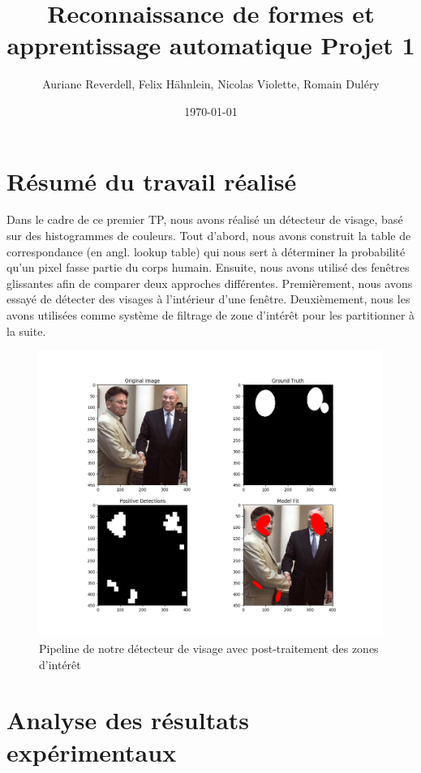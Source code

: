 \documentclass[a4paper,11pt]{article}
\title{Reconnaissance de formes et apprentissage automatique Projet 1}
\author{Auriane Reverdell, Felix Hähnlein, Nicolas Violette, Romain Duléry}
\date{\today}
\begin{document}
\maketitle
\vspace{1cm}

\section{Résumé du travail réalisé}
Dans le cadre de ce premier TP, nous avons réalisé un détecteur de visage, basé sur des histogrammes de couleurs. 
Tout d'abord, nous avons construit la table de correspondance (en angl. lookup table) qui nous sert à déterminer la probabilité qu'un pixel fasse partie du corps humain.
Ensuite, nous avons utilisé des fenêtres glissantes afin de comparer deux approches différentes.
Premièrement, nous avons essayé de détecter des visages à l'intérieur d'une fenêtre. 
Deuxièmement, nous les avons utilisées comme système de filtrage de zone d'intérêt pour les partitionner à la suite.
\begin{figure}[H]
\begin{center}
    \includegraphics[scale=0.4]{resume_clustering.png}
    \caption{Pipeline de notre détecteur de visage avec post-traitement des zones d'intérêt}
\end{center}
\end{figure}

\section{Analyse des résultats expérimentaux}
\end{document}
